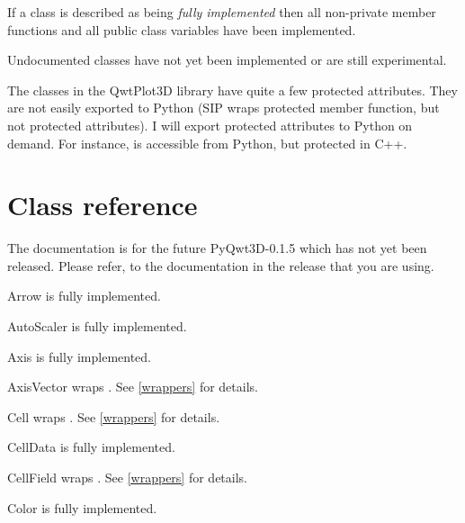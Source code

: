 \documentclass{manual}
\newcommand{\Future}{
  \begin{notice}[warning]
    The documentation is for the future PyQwt3D-0.1.5 which has not yet been
    released.  Please refer, to the documentation in the release that you are
    using.
  \end{notice}
}
\begin{document}
If a class is described as being \emph{fully implemented} then all non-private
member functions and all public class variables have been implemented.

Undocumented classes have not yet been implemented or are still experimental.

The classes in the QwtPlot3D library have quite a few protected attributes.
They are not easily exported to Python (SIP wraps protected member function,
but not protected attributes).
I will export protected attributes to Python on demand. For instance,
 is accessible from Python, but protected in C++.


\section{Class reference \label{classes}}

\Future{}

\begin{classdesc*}{Arrow}
  is fully implemented.
\end{classdesc*}

\begin{classdesc*}{AutoScaler}
  is fully implemented.
\end{classdesc*}

\begin{classdesc*}{Axis}
  is fully implemented.
\end{classdesc*}

\begin{classdesc*}{AxisVector}
  wraps . See \ref{wrappers} for details.
\end{classdesc*}

\begin{classdesc*}{Cell}
  wraps . See \ref{wrappers} for details.
\end{classdesc*}

\begin{classdesc*}{CellData}
  is fully implemented.
\end{classdesc*}

\begin{classdesc*}{CellField}
  wraps . See \ref{wrappers} for details.
\end{classdesc*}

\begin{classdesc*}{Color}
  is fully implemented.
\end{classdesc*}
\end{document}
